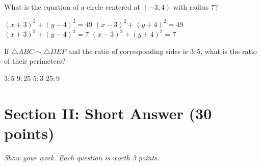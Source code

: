 \documentclass[12pt,addpoints]{exam}
\begin{document}
\begin{questions}
\question What is the equation of a circle centered at $(-3, 4)$ with radius $7$?
\begin{choices}
  \choice $(x + 3)^2 + (y - 4)^2 = 49$
  \choice $(x - 3)^2 + (y + 4)^2 = 49$
  \choice $(x + 3)^2 + (y - 4)^2 = 7$
  \choice $(x - 3)^2 + (y + 4)^2 = 7$
\end{choices}

\question If $\triangle ABC \sim \triangle DEF$ and the ratio of corresponding sides is $3:5$, what is the ratio of their perimeters?
\begin{choices}
  \choice $3:5$
  \choice $9:25$
  \choice $5:3$
  \choice $25:9$
\end{choices}

\end{questions}

\newpage

\section*{Section II: Short Answer \hfill (30 points)}
\noindent\textit{Show your work. Each question is worth 3 points.}
\end{document}
